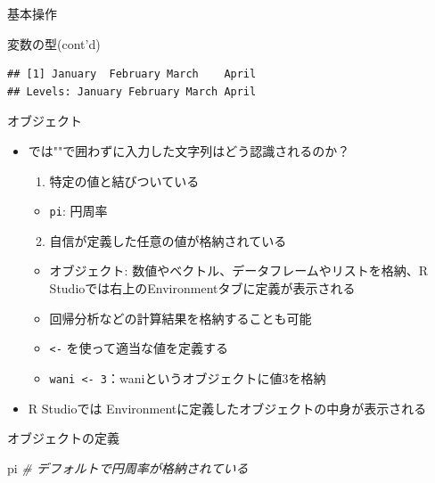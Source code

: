 \documentclass[
  ignorenonframetext,
]{beamer}
\newenvironment{Shaded}{\begin{snugshade}}{\end{snugshade}}
\newcommand{\CommentTok}[1]{\textcolor[rgb]{0.56,0.35,0.01}{\textit{#1}}}
\newcommand{\NormalTok}[1]{#1}
\providecommand{\tightlist}{%
  \setlength{\itemsep}{0pt}\setlength{\parskip}{0pt}}
\begin{document}
\begin{frame}[fragile]{基本操作}
\begin{block}{変数の型(cont'd)}
\begin{verbatim}
## [1] January  February March    April   
## Levels: January February March April
\end{verbatim}
\end{block}

\begin{block}{オブジェクト}
\protect\hypertarget{ux30aaux30d6ux30b8ux30a7ux30afux30c8}{}
\begin{itemize}
\tightlist
\item
  では""で囲わずに入力した文字列はどう認識されるのか？

  \begin{enumerate}
  \tightlist
  \item
    特定の値と結びついている
  \end{enumerate}

  \begin{itemize}
  \tightlist
  \item
    \texttt{pi}: 円周率
  \end{itemize}

  \begin{enumerate}
  \setcounter{enumi}{1}
  \tightlist
  \item
    自信が定義した任意の値が格納されている
  \end{enumerate}

  \begin{itemize}
  \tightlist
  \item
    オブジェクト: 数値やベクトル、データフレームやリストを格納、R
    Studioでは右上のEnvironmentタブに定義が表示される
  \item
    回帰分析などの計算結果を格納することも可能
  \item
    \texttt{\textless{}-} を使って適当な値を定義する
  \item
    \texttt{wani\ \textless{}-\ 3}：waniというオブジェクトに値3を格納
  \end{itemize}
\item
  R Studioでは Environmentに定義したオブジェクトの中身が表示される
\end{itemize}
\end{block}

\begin{block}{オブジェクトの定義}
\protect\hypertarget{ux30aaux30d6ux30b8ux30a7ux30afux30c8ux306eux5b9aux7fa9}{}
\begin{Shaded}
\begin{Highlighting}[]
\NormalTok{pi }\CommentTok{\# デフォルトで円周率が格納されている}
\end{Highlighting}
\end{Shaded}


\end{block}
\end{frame}
\end{document}
